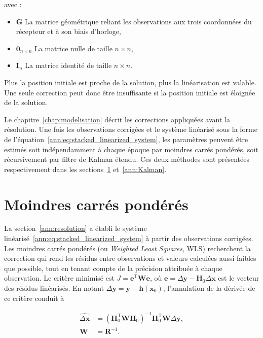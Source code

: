 avec :

\begin{itemize}
    \item $\mathbf G$ La matrice géométrique reliant les observations aux
    trois coordonnées du récepteur et à son biais d'horloge,
    \item $\mathbf 0_{n\times n}$ La matrice nulle de taille $n\times n$,
    \item $\mathbf I_n$ La matrice identité de taille $n\times n$.
\end{itemize}

Plus la position initiale est proche de la solution, plus la linéarisation est valable. Une seule correction peut donc être insuffisante si la
position initiale est éloignée de la solution.

Le chapitre~\ref{chap:modelisation} décrit les corrections
appliquées avant la résolution. Une fois les observations corrigées et le
système linéarisé sous la forme de l'équation~\eqref{ann:eq:stacked_linearized_system},
les paramètres peuvent être estimés soit indépendamment à chaque époque par
moindres carrés pondérés, soit récursivement par filtre de Kalman étendu. Ces
deux méthodes sont présentées respectivement dans les
sections~\ref{ann:sec:wls} et~\ref{ann:Kalman}.

\section{Moindres carrés pondérés}
\label{ann:sec:wls}

La section~\ref{ann:resolution} a établi le système
linéarisé~\eqref{ann:eq:stacked_linearized_system} à partir des observations
corrigées. Les moindres carrés pondérés (ou \textit{Weighted Least Squares}, WLS) recherchent la correction qui rend les résidus
entre observations et valeurs calculées aussi faibles que possible, tout en
tenant compte de la précision attribuée à chaque observation. Le critère
minimisé est $J=\mathbf e^{\mathsf T}\mathbf W\mathbf e$, où
$\mathbf e=\Delta\mathbf y-\mathbf H_0\Delta\mathbf x$ est le vecteur des
résidus linéarisés. En notant
$\Delta\mathbf y=\mathbf y-\mathbf h(\mathbf x_0)$, l'annulation de la dérivée
de ce critère conduit à

\begin{align}
\widehat{\Delta\mathbf x}
&=
\left(\mathbf H_0^{\mathsf T}\mathbf W\mathbf H_0\right)^{-1}
\mathbf H_0^{\mathsf T}\mathbf W\Delta\mathbf y,
\\
\mathbf W
&=
\mathbf R^{-1}.
\label{ann:eq:wls_solution}
\end{align}

